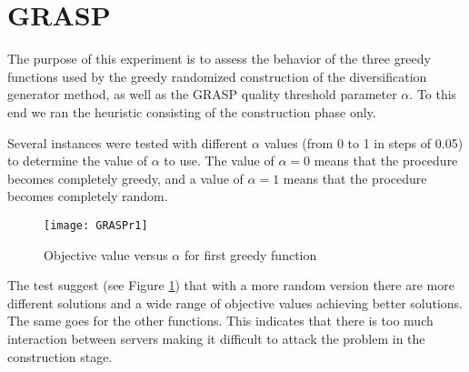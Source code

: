 \section{GRASP}
The purpose of this experiment
is to assess the behavior of the three greedy functions
used by the greedy randomized construction
of the diversification generator method,
as well as the GRASP quality threshold parameter $\alpha$.
To this end
we ran the heuristic consisting of
the construction phase only.

Several instances were tested
with different $\alpha$ values
(from 0 to 1 in steps of 0.05)
to determine the value of $\alpha$ to use.
The value of $\alpha = 0$ means that
the procedure becomes completely greedy,
and a value of $\alpha = 1$ means that
the procedure becomes completely random.
\begin{figure}[!ht]
  \centering
  \label{fig:grasp-results}
  \texttt{[image: GRASPr1]}
  \caption{Objective value versus $\alpha$ for first greedy function}
\end{figure}
The test suggest
(see Figure \ref{fig:grasp-results})
that
with a more random version
there are more different solutions
and a wide range of objective values
achieving better solutions.
The same goes for the other functions.
This indicates
that there is too much interaction between servers
making it difficult to attack the problem
in the construction stage.
